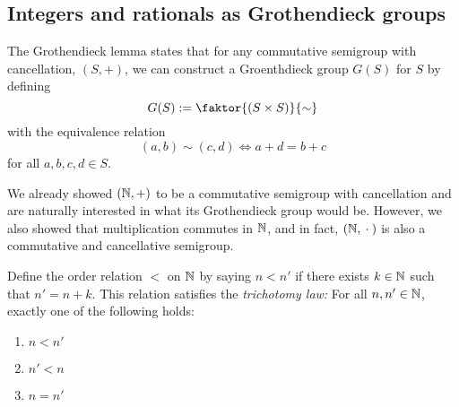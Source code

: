 \documentclass[master.tex]{subfiles}
\begin{document}
    \subsection{Integers and rationals as Grothendieck groups}
    The Grothendieck lemma states that for any commutative semigroup with cancellation, $(S, +)$, we can construct a Groenthdieck group $G(S)$ for $S$ by defining
    \[
        G(S) := \faktor{(S \times S)}{\sim}
    \]
    with the equivalence relation
    \[
        (a, b) \sim (c, d) \iff a + d = b + c
    \]
    for all $a, b, c, d \in S$.
    
    We already showed $(\mathbb{N}, +)$ to be a commutative semigroup with cancellation and are naturally interested in what its Grothendieck group would be.
    However, we also showed that multiplication commutes in $\mathbb{N}$, and in fact, $(\mathbb{N}, {}\cdot{}{})$ is also a commutative and cancellative semigroup.

    \begin{remark}
        Define the order relation $<$ on $\mathbb{N}$ by saying $n < n'$ if there exists $k \in \mathbb{N}$ such that $n' = n + k$.
        This relation satisfies the \emph{trichotomy law:} For all $n, n' \in \mathbb{N}$, exactly one of the following holds:
        \begin{enumerate}
            \item $n < n'$
            \item $n' < n$
            \item $n = n'$
        \end{enumerate}
    \end{remark}
\end{document}
